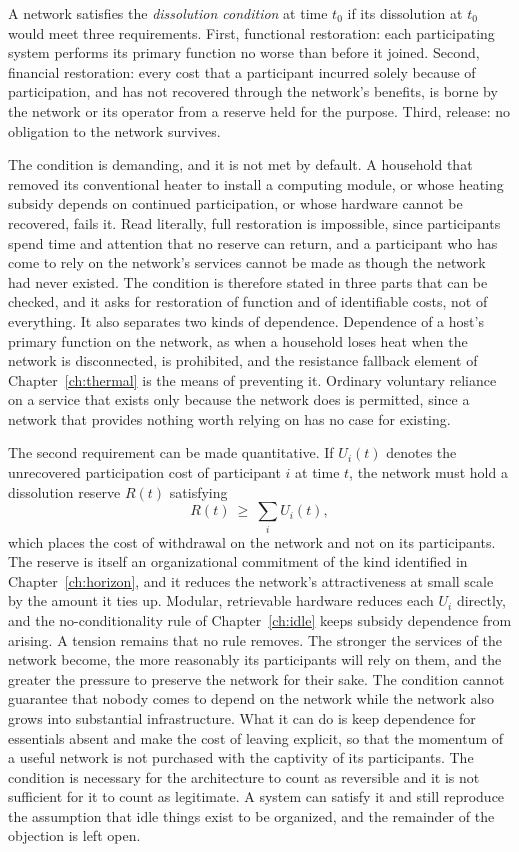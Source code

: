 \begin{definition}
\label{def:dissolution}
A network satisfies the \emph{dissolution condition} at time $t_0$ if its dissolution at $t_0$ would meet three requirements. First, functional restoration: each participating system performs its primary function no worse than before it joined. Second, financial restoration: every cost that a participant incurred solely because of participation, and has not recovered through the network's benefits, is borne by the network or its operator from a reserve held for the purpose. Third, release: no obligation to the network survives.
\end{definition}

The condition is demanding, and it is not met by default. A household that removed its conventional heater to install a computing module, or whose heating subsidy depends on continued participation, or whose hardware cannot be recovered, fails it. Read literally, full restoration is impossible, since participants spend time and attention that no reserve can return, and a participant who has come to rely on the network's services cannot be made as though the network had never existed. The condition is therefore stated in three parts that can be checked, and it asks for restoration of function and of identifiable costs, not of everything. It also separates two kinds of dependence. Dependence of a host's primary function on the network, as when a household loses heat when the network is disconnected, is prohibited, and the resistance fallback element of Chapter~\ref{ch:thermal} is the means of preventing it. Ordinary voluntary reliance on a service that exists only because the network does is permitted, since a network that provides nothing worth relying on has no case for existing.

The second requirement can be made quantitative. If $U_i(t)$ denotes the unrecovered participation cost of participant $i$ at time $t$, the network must hold a dissolution reserve $R(t)$ satisfying
\[
R(t)\ \ge\ \sum_i U_i(t),
\]
which places the cost of withdrawal on the network and not on its participants. The reserve is itself an organizational commitment of the kind identified in Chapter~\ref{ch:horizon}, and it reduces the network's attractiveness at small scale by the amount it ties up. Modular, retrievable hardware reduces each $U_i$ directly, and the no-conditionality rule of Chapter~\ref{ch:idle} keeps subsidy dependence from arising. A tension remains that no rule removes. The stronger the services of the network become, the more reasonably its participants will rely on them, and the greater the pressure to preserve the network for their sake. The condition cannot guarantee that nobody comes to depend on the network while the network also grows into substantial infrastructure. What it can do is keep dependence for essentials absent and make the cost of leaving explicit, so that the momentum of a useful network is not purchased with the captivity of its participants. The condition is necessary for the architecture to count as reversible and it is not sufficient for it to count as legitimate. A system can satisfy it and still reproduce the assumption that idle things exist to be organized, and the remainder of the objection is left open.

